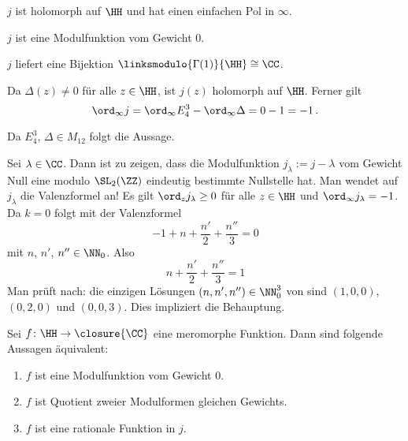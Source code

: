 \begin{satz-list}
	\item $j$ ist holomorph auf $\HH$ und hat einen einfachen Pol in $\infty$.
	\item $j$ ist eine Modulfunktion vom Gewicht $0$.
	\item $j$ liefert eine Bijektion $\linksmodulo{\Gamma(1)}{\HH} \cong \CC$.
\end{satz-list}

\begin{bewe-list}
	\item  Da $\Delta(z) \not= 0$ für alle $z\in\HH$, ist $j(z)$ holomorph auf $\HH$.
	Ferner gilt
	\[
		\ord_\infty j = \ord_\infty E_4^3 - \ord_\infty \Delta = 0 - 1 = -1
		\,.
	\]
	\item Da $E_4^3$, $\Delta \in M_{12}$ folgt die Aussage.
	\item Sei $\lambda \in \CC$. Dann ist zu zeigen, dass die Modulfunktion $j_\lambda := j - \lambda$ vom Gewicht Null eine modulo $\SL_2(\ZZ)$ eindeutig bestimmte Nullstelle hat.
	Man wendet auf $j_\lambda$ die Valenzformel an!
	Es gilt $\ord_z j_\lambda \geq 0$ für alle $z\in\HH$ und $\ord_\infty j_\lambda = -1$.
	Da $k = 0$ folgt mit der Valenzformel
	\[
		-1 + n + \frac{n'}{2} + \frac{n''}{3} = 0
	\]
	mit $n$, $n'$, $n'' \in \NN_0$.
	Also
	\[\tag{*}
		n + \frac{n'}{2} + \frac{n''}{3} = 1
	\]
	Man prüft nach: die einzigen Lösungen $(n,n',n'') \in \NN_0^3$ von \myref{*} sind $(1,0,0)$, $(0,2,0)$ und $(0,0,3)$.
	Dies impliziert die Behauptung.
\end{bewe-list}

\begin{satz}
	Sei $f\colon \HH \to \closure{\CC}$ eine meromorphe Funktion. Dann sind folgende Aussagen äquivalent:
	\begin{enumerate}
		\item $f$ ist eine Modulfunktion vom Gewicht 0.
		\item $f$ ist Quotient zweier Modulformen gleichen Gewichts.
		\item $f$ ist eine rationale Funktion in $j$.
	\end{enumerate}
\end{satz}

